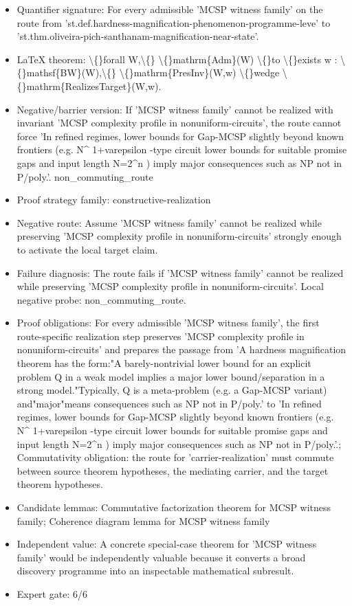\documentclass[11pt]{article}
\begin{document}
\begin{itemize}
\item Quantifier signature: For every admissible 'MCSP witness family' on the route from 'st.def.hardness-magnification-phenomenon-programme-leve' to 'st.thm.oliveira-pich-santhanam-magnification-near-state'.
\item LaTeX theorem: \textbackslash\{\}forall W,\textbackslash\{\} \textbackslash\{\}mathrm\{Adm\}(W) \textbackslash\{\}to \textbackslash\{\}exists w : \textbackslash\{\}mathsf\{BW\}(W),\textbackslash\{\} \textbackslash\{\}mathrm\{PresInv\}(W,w) \textbackslash\{\}wedge \textbackslash\{\}mathrm\{RealizesTarget\}(W,w).
\item Negative/barrier version: If 'MCSP witness family' cannot be realized with invariant 'MCSP complexity profile in nonuniform-circuits', the route cannot force 'In refined regimes, lower bounds for Gap-MCSP slightly beyond known frontiers (e.g. N\textasciicircum{} 1+varepsilon -type circuit lower bounds for suitable promise gaps and input length N=2\textasciicircum{}n ) imply major consequences such as NP not in P/poly.'. non\_commuting\_route
\item Proof strategy family: constructive-realization
\item Negative route: Assume 'MCSP witness family' cannot be realized while preserving 'MCSP complexity profile in nonuniform-circuits' strongly enough to activate the local target claim.
\item Failure diagnosis: The route fails if 'MCSP witness family' cannot be realized while preserving 'MCSP complexity profile in nonuniform-circuits'. Local negative probe: non\_commuting\_route.
\item Proof obligations: For every admissible 'MCSP witness family', the first route-specific realization step preserves 'MCSP complexity profile in nonuniform-circuits' and prepares the passage from 'A hardness magnification theorem has the form:"A barely-nontrivial lower bound for an explicit problem Q in a weak model implies a major lower bound/separation in a strong model."Typically, Q is a meta-problem (e.g. a Gap-MCSP variant) and"major"means consequences such as NP not in P/poly.' to 'In refined regimes, lower bounds for Gap-MCSP slightly beyond known frontiers (e.g. N\textasciicircum{} 1+varepsilon -type circuit lower bounds for suitable promise gaps and input length N=2\textasciicircum{}n ) imply major consequences such as NP not in P/poly.'.; Commutativity obligation: the route for 'carrier-realization' must commute between source theorem hypotheses, the mediating carrier, and the target theorem hypotheses.
\item Candidate lemmas: Commutative factorization theorem for MCSP witness family; Coherence diagram lemma for MCSP witness family
\item Independent value: A concrete special-case theorem for 'MCSP witness family' would be independently valuable because it converts a broad discovery programme into an inspectable mathematical subresult.
\item Expert gate: 6/6
\end{itemize}
\end{document}
